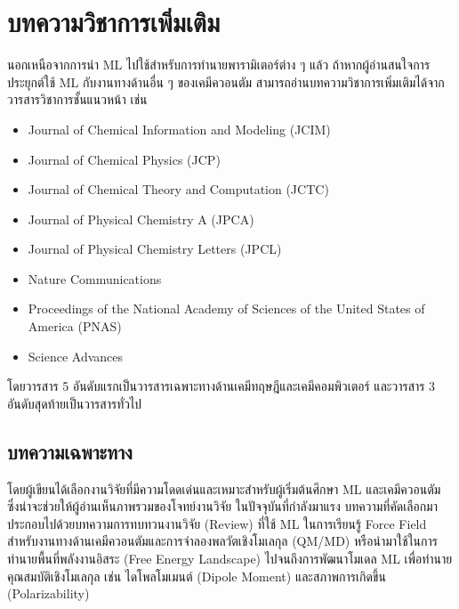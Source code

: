 
\section{บทความวิชาการเพิ่มเติม}
\label{sec:pred_misc_papers}

นอกเหนือจากการนำ ML ไปใช้สำหรับการทำนายพารามิเตอร์ต่าง ๆ แล้ว ถ้าหากผู้อ่านสนใจการประยุกต์ใช้ ML กับงานทางด้านอื่น ๆ ของเคมีควอนตัม 
สามารถอ่านบทความวิชาการเพิ่มเติมได้จากวารสารวิชาการชั้นแนวหน้า เช่น 

\begin{itemize}[topsep=0pt,noitemsep]
    \item Journal of Chemical Information and Modeling (JCIM) 
    
    \item Journal of Chemical Physics (JCP)
    
    \item Journal of Chemical Theory and Computation (JCTC)
    
    \item Journal of Physical Chemistry A (JPCA)
    
    \item Journal of Physical Chemistry Letters (JPCL)
    
    \item Nature Communications
    
    \item Proceedings of the National Academy of Sciences of the United States of America (PNAS)
    
    \item Science Advances
\end{itemize}

\noindent โดยวารสาร 5 อันดับแรกเป็นวารสารเฉพาะทางด้านเคมีทฤษฎีและเคมีคอมพิวเตอร์ และวารสาร 3 อันดับสุดท้ายเป็นวารสารทั่วไป

\subsection{บทความเฉพาะทาง}
\label{ssec:pred_misc_papers_specific}

โดยผู้เขียนได้เลือกงานวิจัยที่มีความโดดเด่นและเหมาะสำหรับผู้เริ่มต้นศึกษา ML และเคมีควอนตัม ซึ่งน่าจะช่วยให้ผู้อ่านเห็นภาพรวมของโจทย์งานวิจัย%
ในปัจจุบันที่กำลังมาแรง บทความที่คัดเลือกมาประกอบไปด้วยบทความการทบทวนงานวิจัย (Review) ที่ใช้ ML ในการเรียนรู้ Force Field 
สำหรับงานทางด้านเคมีควอนตัมและการจําลองพลวัตเชิงโมเลกุล (QM/MD) หรือนำมาใช้ในการทำนายพื้นที่พลังงานอิสระ (Free Energy Landscape)
ไปจนถึงการพัฒนาโมเดล ML เพื่อทำนายคุณสมบัติเชิงโมเลกุล เช่น ไดโพลโมเมนต์ (Dipole Moment) และสภาพการเกิดขึ้น (Polarizability)

